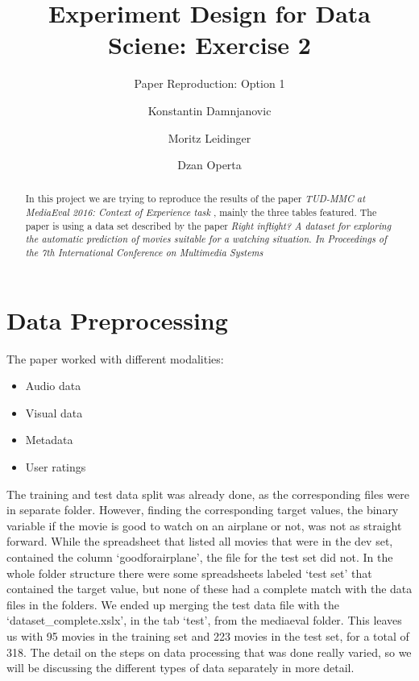 \documentclass[sigconf]{acmart}
\begin{document}
\title{Experiment Design for Data Sciene: Exercise 2}
\subtitle{Paper Reproduction: Option 1}

\author{Konstantin Damnjanovic}

\author{Moritz Leidinger}

\author{Dzan Operta}


\begin{abstract}
In this project we are trying to reproduce the results of the paper \textit{TUD-MMC at MediaEval 2016: Context of Experience task} \cite{aa}, mainly the three tables featured. The paper is using a data set described by the paper \textit{Right inﬂight? A dataset for exploring the automatic prediction of movies suitable for a watching situation. In Proceedings of the 7th International Conference on Multimedia Systems} \cite{bb}
\end{abstract}


\maketitle

\section{Data Preprocessing}
The paper worked with different modalities:
\begin{itemize}
\item {Audio data}
\item {Visual data}
\item {Metadata}
\item {User ratings}
\end{itemize}
The training and test data split was already done, as the corresponding files were in separate folder. However, finding the corresponding target values, the binary variable if the movie is good to watch on an airplane or not, was not as straight forward. While the spreadsheet that listed all movies that were in the dev set, contained the column \lq goodforairplane\rq, the file for the test set did not. In the whole folder structure there were some spreadsheets labeled ‘test set’ that contained the target value, but none of these had a complete match with the data files in the folders. We ended up merging the test data file with the \lq dataset\_complete.xslx\rq , in the tab \lq test\rq, from the mediaeval folder. This leaves us with 95 movies in the training set and 223 movies in the test set, for a total of 318. The detail on the steps on data processing that was done really varied, so we will be discussing the different types of data separately in more detail.
\end{document}
